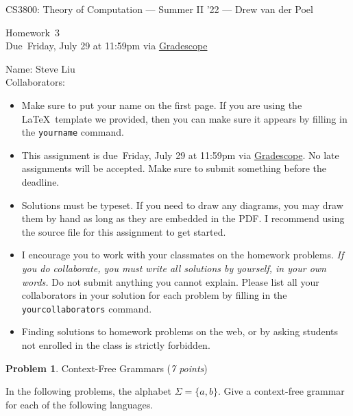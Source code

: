 \documentclass[11pt]{article}
\newcommand{\yourname}{}
\newcommand{\yourcollaborators}{}
\theoremstyle{definition}
\newcommand{\instructor}{Drew van der Poel}
\newcommand{\hwnum}{3}
\newcommand{\hwdue}{Friday, July 29 at 11:59pm via \href{https://www.gradescope.com/courses/406943}{Gradescope}}
\theoremstyle{theorem}
\newtheorem{prob}{Problem}
\begin{document}
{\Large 
\begin{center}{CS3800: Theory of Computation} --- Summer II '22 --- \instructor \end{center}}
{\large
\vspace{10pt}
\noindent Homework~\hwnum \vspace{2pt}\\
Due~\hwdue}

\bigskip
{\large
\noindent Name: Steve Liu \yourname \vspace{2pt}\\ Collaborators: \yourcollaborators}

\vspace{15pt}
\begin{itemize}

\item Make sure to put your name on the first page.  If you are using the \LaTeX~template we provided, then you can make sure it appears by filling in the \texttt{yourname} command.

\item This assignment is due~\hwdue.  No late assignments will be accepted.  Make sure to submit something before the deadline.

\item Solutions must be typeset.  If you need to draw any diagrams, you may draw them by hand as long as they are embedded in the PDF.  I recommend using the source file for this assignment to get started.

\item I encourage you to work with your classmates on the homework problems. \emph{If you do collaborate, you must write all solutions by yourself, in your own words.}  Do not submit anything you cannot explain.  Please list all your collaborators in your solution for each problem by filling in the \texttt{yourcollaborators} command.

\item Finding solutions to homework problems on the web, or by asking students not enrolled in the class is strictly forbidden.

\end{itemize}


\newpage

\begin{prob} Context-Free Grammars (\emph{7 points})\end{prob}

In the following problems, the alphabet $\Sigma = \{a, b\}$. Give a context-free grammar for each of the following languages.
\end{document}
